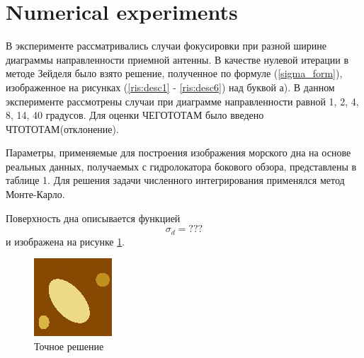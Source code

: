 \documentclass{procDDs}
\begin{document}
\section{Numerical experiments}
В эксперименте рассматривались случаи фокусировки при разной ширине диаграммы направленности приемной антенны. В качестве нулевой итерации в методе Зейделя было взято решение, полученное по формуле (\ref{sigma_form}), изображенное на рисунках (\ref{ris:desc1} - \ref{ris:desc6}) над буквой а). В данном эксперименте рассмотрены случаи при диаграмме направленности равной 1, 2, 4, 8, 14, 40 градусов. Для оценки ЧЕГОТОТАМ было введено ЧТОТОТАМ(отклонение). 

Параметры, применяемые для построения изображения морского дна на основе реальных данных, получаемых с гидролокатора бокового обзора, представлены в таблице 1. Для решения задачи численного интегрирования применялся метод Монте-Карло. 
\begin{table}[!ht]
	\label{table:name}
\end{table}

Поверхность дна описывается функцией 
\begin{equation}
	\sigma_d=???
\end{equation}
 и изображена на рисунке \ref{ris:dno}.

\begin{figure}[h!]\center
	
		\includegraphics[width=0.3\linewidth]{img/dno.jpg}
	\caption{Точное решение}
	\label{ris:dno}
\end{figure}
\end{document}
